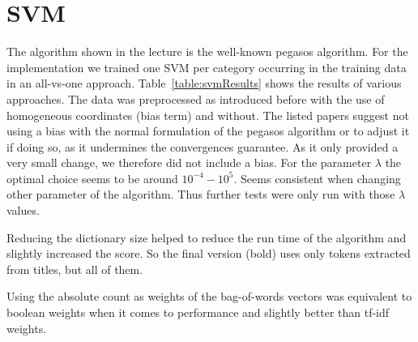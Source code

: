 \documentclass{article}
\begin{document}
\section*{SVM}
The algorithm shown in the lecture is the well-known pegasos algorithm\cite{shalev-shwartz_pegasos:_2011,shalev-shwartz_pegasos:_????}. For the implementation we trained one SVM per category occurring in the training data in an all-vs-one approach.
Table~\ref{table:svmResults} shows the results of various approaches.
The data was preprocessed as introduced before with the use of homogeneous coordinates (bias term) and without. The listed papers suggest not using a bias with the normal formulation of the pegasos algorithm or to adjust it if doing so, as it undermines the convergences guarantee. As it only provided a very small change, we therefore did not include a bias. For the parameter $\lambda$ the optimal choice seems to be around $10^{-4} - 10^{5}$. Seems consistent when changing other parameter of the algorithm. Thus further tests were only run with those $\lambda$ values.

Reducing the dictionary size helped to reduce the run time of the algorithm and slightly increased the score. So the final version (bold) uses only tokens extracted from titles, but all of them.

Using the absolute count as weights of the bag-of-words vectors was equivalent to boolean weights when it comes to performance and slightly better than tf-idf weights.
\end{document}
